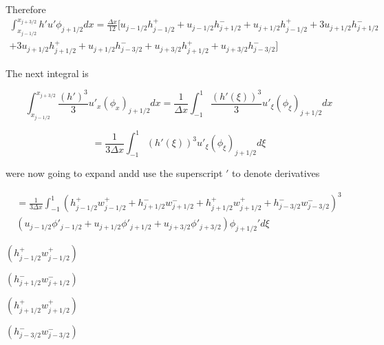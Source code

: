 \documentclass[12pt]{article}
\begin{document}
Therefore
\begin{multline}
\int_{x_{j-1/2}}^{x_{j+3/2}} h'u'\phi_{j+1/2} dx= \frac{\Delta x}{12} \bigg[ u_{j- 1/2}h^+_{j- 1/2} + u_{j- 1/2}h^-_{j+ 1/2}
+  u_{j+1/2}h^+_{j- 1/2} + 3u_{j+1/2}h^-_{j+ 1/2} \\ + 3u_{j+1/2} h^+_{j+ 1/2}  + u_{j+1/2} h^-_{j- 3/2}
+u_{j+ 3/2}h^+_{j+ 1/2} + u_{j+ 3/2}h^-_{j- 3/2} \bigg]
\end{multline}

The next integral is 

\[\int_{x_{j-1/2}}^{x_{j+3/2}}\frac{(h')^3}{3}u'_{x}(\phi_{x})_{j+1/2}dx = \frac{1}{\Delta x} \int_{-1}^{1} \frac{(h'(\xi))^3}{3}u'_{\xi}(\phi_{\xi})_{j+1/2}dx\]

\[ = \frac{1}{3\Delta x} \int_{-1}^{1} (h'(\xi))^3u'_{\xi}(\phi_{\xi})_{j+1/2}d\xi\]

were now going to expand andd use the superscript $'$ to denote derivatives

\begin{multline}
= \frac{1}{3\Delta x} \int_{-1}^{1} \left(h^+_{j- 1/2}w^+_{j - 1/2} + h^-_{j+ 1/2}w^-_{j + 1/2} + h^+_{j+ 1/2}w^+_{j + 1/2} + h^-_{j- 3/2}w^-_{j - 3/2}\right)^3 \\ \left(u_{j- 1/2}\phi'_{j - 1/2} + u_{j+1/2}\phi'_{j+1/2} +u_{j+ 3/2}\phi'_{j+ 3/2} \right)\phi_{j+1/2}'d\xi
\end{multline}

$\left(h^+_{j- 1/2}w^+_{j - 1/2}\right)$

$\left(h^-_{j+ 1/2}w^-_{j + 1/2}\right)$

$\left(h^+_{j+ 1/2}w^+_{j + 1/2}\right)$

$\left(h^-_{j- 3/2}w^-_{j - 3/2}\right)$
\end{document}
